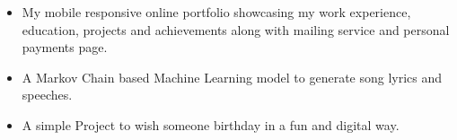 \documentclass[10pt,a4paper,ragged2e]{altacv}
\begin{document}
\begin{itemize}
\item My mobile responsive online portfolio showcasing my work experience, education, projects and achievements along with mailing service and personal payments page. 
\end{itemize}

\begin{itemize}
\item A Markov Chain based Machine Learning model to generate song lyrics and speeches. 
\end{itemize}


\begin{itemize}
\item  A simple Project to wish someone birthday in a fun and digital way.
\end{itemize}




\end{document}
